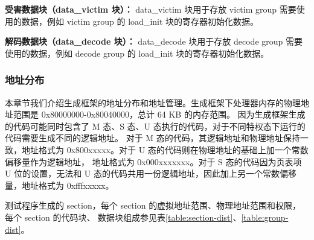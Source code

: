 \textbf{受害数据块（data\_victim 块）：}
data\_victim 块用于存放 victim group 需要使用的数据，例如 victim group 的 load\_init 块的寄存器初始化数据。\par

\textbf{解码数据块（data\_decode 块）：}
data\_decode 块用于存放 decode group 需要使用的数据，例如 decode group 的 load\_init 块的寄存器初始化数据。\par

\subsubsection{地址分布}

本章节我们介绍生成框架的地址分布和地址管理。生成框架下处理器内存的物理地址范围是 0x80000000-0x80040000，总计 64 KB 的内存范围。
因为生成框架生成的代码可能同时包含了 M 态、S 态、U 态执行的代码，对于不同特权态下运行的代码需要生成不同的逻辑地址。
对于 M 态的代码，其逻辑地址和物理地址保持一致，地址格式为 0x800xxxxx。对于 U 态的代码则在物理地址的基础上加一个常数偏移量作为逻辑地址，
地址格式为 0x000xxxxxxx。对于 S 态的代码因为页表项 U 位的设置，无法和 U 态的代码共用一份逻辑地址，因此加上另一个常数偏移量，地址格式为
0xfffxxxxx。\par

测试程序生成的 section，每个 section 的虚拟地址范围、物理地址范围和权限，每个 section 的代码块、
数据块组成参见表\ref{table:section-dist}、\ref{table:group-dist}。

